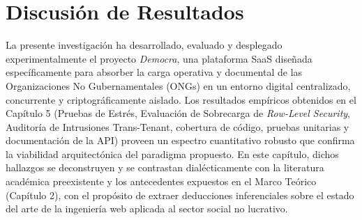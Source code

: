 \section{Discusi\'on de Resultados}

La presente investigaci\'on ha desarrollado, evaluado y desplegado experimentalmente el proyecto \textit{Democra}, una plataforma SaaS dise\~nada espec\'ificamente para absorber la carga operativa y documental de las Organizaciones No Gubernamentales (ONGs) en un entorno digital centralizado, concurrente y criptogr\'aficamente aislado. Los resultados emp\'iricos obtenidos en el Cap\'itulo 5 (Pruebas de Estr\'es, Evaluaci\'on de Sobrecarga de \textit{Row-Level Security}, Auditor\'ia de Intrusiones Trans-Tenant, cobertura de c\'odigo, pruebas unitarias y documentaci\'on de la API) proveen un espectro cuantitativo robusto que confirma la viabilidad arquitect\'onica del paradigma propuesto. En este cap\'itulo, dichos hallazgos se deconstruyen y se contrastan dial\'ecticamente con la literatura acad\'emica preexistente y los antecedentes expuestos en el Marco Te\'orico (Cap\'itulo 2), con el prop\'osito de extraer deducciones inferenciales sobre el estado del arte de la ingenier\'ia web aplicada al sector social no lucrativo.
